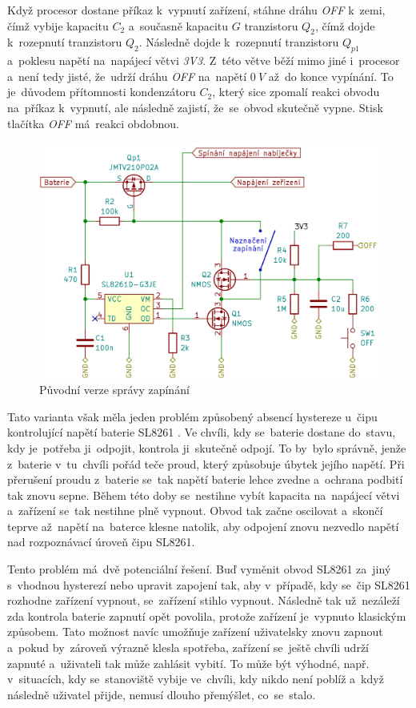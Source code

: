 Když procesor dostane příkaz k~vypnutí zařízení, stáhne dráhu {\it OFF} k~zemi, čímž vybije kapacitu \(C_{2}\) a~současně kapacitu \(G\) tranzistoru \(Q_{2}\), čímž dojde k~rozepnutí tranzistoru \(Q_{2}\).
Následně dojde k~rozepnutí tranzistoru \(Q_{p1}\) a~poklesu napětí na~napájecí větvi {\it 3V3}.
Z~této větve běží mimo jiné i~procesor a~není tedy jisté, že~udrží dráhu {\it OFF} na~napětí \(0~V\) až~do konce vypínání.
To je~důvodem přítomnosti kondenzátoru \(C_{2}\), který sice zpomalí reakci obvodu na~příkaz k~vypnutí, ale následně zajistí, že~se~obvod skutečně vypne.
Stisk tlačítka {\it OFF} má~reakci obdobnou. 

\begin{figure}[h!]
    \centering
    \includegraphics[width=\textwidth]{text/PraktickaCast/img/stary_power_manager.png}
    \caption{Původní verze správy zapínání}
    \label{fig:stary_PoverManager}
\end{figure}

Tato varianta však měla jeden problém způsobený absencí hystereze u~čipu kontrolující napětí baterie SL8261 \cite{SL8261}.
Ve chvíli, kdy se~baterie dostane do~stavu, kdy je~potřeba ji~odpojit, kontrola ji~skutečně odpojí.
To by~bylo správně, jenže z~baterie v~tu~chvíli pořád teče proud, který způsobuje úbytek jejího napětí.
Při přerušení proudu z~baterie se~tak napětí baterie lehce zvedne a~ochrana podbití tak znovu sepne.
Během této doby se~nestihne vybít kapacita na~napájecí větvi a~zařízení se~tak nestihne plně vypnout.
Obvod tak začne oscilovat a~skončí teprve až~napětí na~baterce klesne natolik, aby odpojení znovu nezvedlo napětí nad rozpoznávací úroveň čipu SL8261.

Tento problém má~dvě potenciální řešení.
Buď vyměnit obvod SL8261 za~jiný s~vhodnou hysterezí nebo upravit zapojení tak, aby v~případě, kdy se~čip SL8261 rozhodne zařízení vypnout, se~zařízení stihlo vypnout.
Následně tak už~nezáleží zda kontrola baterie zapnutí opět povolila, protože zařízení je~vypnuto klasickým způsobem.
Tato možnost navíc umožňuje zařízení uživatelsky znovu zapnout a~pokud by~zároveň výrazně klesla spotřeba, zařízení se~ještě chvíli udrží zapnuté a~uživateli tak může zahlásit vybití.
To může být výhodné, např. v~situacích, kdy se~stanoviště vybije ve~chvíli, kdy nikdo není poblíž a~když následně uživatel přijde, nemusí dlouho přemýšlet, co~se~stalo.

